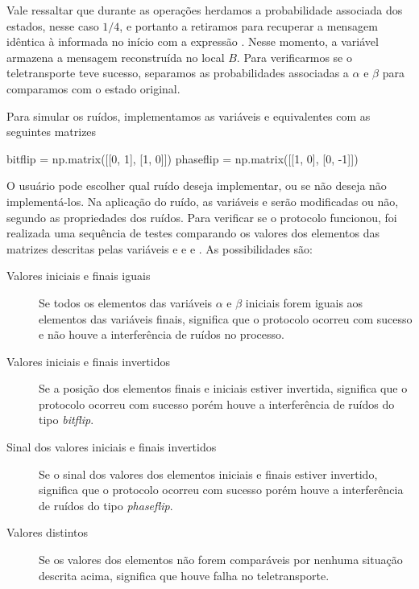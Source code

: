 Vale ressaltar que durante as operações herdamos a probabilidade associada dos estados, nesse caso $1/4$, e portanto a retiramos para recuperar a mensagem idêntica à informada no início com a expressão . Nesse momento, a variável  armazena a mensagem reconstruída no local \(B\). Para verificarmos se o teletransporte teve sucesso, separamos as probabilidades associadas a $\alpha$ e $\beta$ para comparamos com o estado original.

Para simular os ruídos, implementamos as variáveis  e  equivalentes com as seguintes matrizes
\begin{pycode}
  bitflip = np.matrix([[0, 1], [1, 0]])
  phaseflip = np.matrix([[1, 0], [0, -1]])
\end{pycode}
O usuário pode escolher qual ruído deseja implementar, ou se não deseja não implementá-los. Na aplicação do ruído, as variáveis  e  serão modificadas ou não, segundo as propriedades dos ruídos. Para verificar se o protocolo funcionou, foi realizada uma sequência de testes comparando os valores dos elementos das matrizes descritas pelas variáveis  e  e  e . As possibilidades são:
\begin{description}
  \item [Valores iniciais e finais iguais] Se todos os elementos das variáveis $\alpha$ e $\beta$ iniciais forem iguais aos elementos das variáveis finais, significa que o protocolo ocorreu com sucesso e não houve a interferência de ruídos no processo.
  \item [Valores iniciais e finais invertidos] Se a posição dos elementos finais e iniciais estiver invertida, significa que o protocolo ocorreu com sucesso porém houve a interferência de ruídos do tipo \textit{bitflip}.
  \item [Sinal dos valores iniciais e finais invertidos] Se o sinal dos valores dos elementos iniciais e finais estiver invertido, significa que o protocolo ocorreu com sucesso porém houve a interferência de ruídos do tipo \textit{phaseflip}.
  \item [Valores distintos] Se os valores dos elementos não forem comparáveis por nenhuma situação descrita acima, significa que houve falha no teletransporte.
\end{description}

